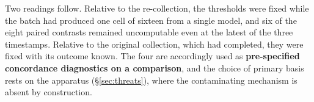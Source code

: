 Two readings follow. Relative to the re-collection, the thresholds were fixed while the batch had produced
one cell of sixteen from a single model, and six of the eight paired contrasts remained uncomputable even
at the latest of the three timestamps. Relative to the original collection, which had completed, they were
fixed with its outcome known. The four are accordingly used as \textbf{pre-specified concordance
diagnostics on a comparison}, and the choice of primary basis rests on the apparatus (\S\ref{sec:threats}),
where the contaminating mechanism is absent by construction.
